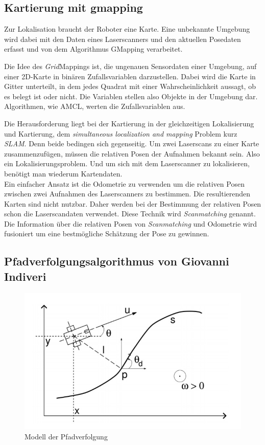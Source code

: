 \documentclass[11pt,a4paper]{article}
\begin{document}
\subsection{Kartierung mit gmapping  \cite{Gmapping}} \label{ssection:gmapping}
{
	Zur Lokalisation braucht der Roboter eine Karte. Eine unbekannte Umgebung wird dabei mit den Daten eines Laserscanners und den aktuellen Posedaten erfasst und von dem Algorithmus GMapping verarbeitet.
	
	Die Idee des  \textit{Grid}Mappings ist, die ungenauen Sensordaten einer Umgebung, auf einer 2D-Karte in bin\"aren Zufallsvariablen darzustellen. Dabei wird die Karte in Gitter unterteilt, in dem jedes Quadrat mit einer Wahrscheinlichkeit aussagt, ob es belegt ist oder nicht. Die Variablen stellen also Objekte in der Umgebung dar. Algorithmen, wie AMCL, werten die Zufallsvariablen aus.  
	
	Die Herausforderung liegt bei der Kartierung in der gleichzeitigen Lokalisierung und Kartierung, dem \textit{simultaneous localization and mapping} Problem kurz \textit{SLAM}. Denn beide bedingen sich gegenseitig. Um  zwei Laserscans zu einer Karte zusammenzuf\"ugen, m\"ussen die relativen Posen der Aufnahmen bekannt sein. Also ein Lokalisierungsproblem. Und um sich mit dem Laserscanner zu lokalisieren, ben\"otigt man wiederum Kartendaten. \\
    
    Ein einfacher Ansatz ist die Odometrie zu verwenden um die relativen Posen zwischen zwei Aufnahmen des Laserscanners zu bestimmen. Die resultierenden Karten sind nicht nutzbar. Daher werden bei der Bestimmung der relativen Posen schon die Laserscandaten verwendet. Diese Technik wird \textit{Scanmatching} genannt. Die Information über die relativen Posen von \textit{Scanmatching} und Odometrie wird fusioniert um eine bestm\"ogliche Sch\"atzung der Pose zu gewinnen.

\subsection{Pfadverfolgungsalgorithmus von Giovanni Indiveri}


\begin{figure}[h]
	\includegraphics[width=\linewidth]{pictures/Pfadverfolgung.JPG}
	\caption{Modell der Pfadverfolgung}
\end{figure}

}
\end{document}
